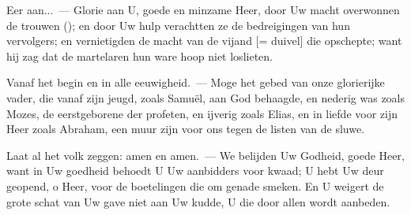 \documentclass[12pt,twoside,a5paper]{article}
\begin{document}
\begin{halfparskip}
  Eer aan...~--- Glorie aan U, goede en minzame Heer, door Uw macht overwonnen de trouwen (); en door Uw hulp verachtten ze de bedreigingen van hun vervolgers; en vernietigden de macht van de vijand [= duivel] die opschepte; want hij zag dat de martelaren hun ware hoop niet loslieten.

  Vanaf het begin en in alle eeuwigheid.~--- Moge het gebed van onze glorierijke vader, die vanaf zijn jeugd, zoals Samuël, aan God behaagde, en nederig was zoals Mozes, de eerstgeborene der profeten, en ijverig zoals Elias, en in liefde voor zijn Heer zoals Abraham, een muur zijn voor ons tegen de listen van de sluwe.

  Laat al het volk zeggen: amen en amen.~--- We belijden Uw Godheid, goede Heer, want in Uw goedheid behoedt U Uw aanbidders voor kwaad; U hebt Uw deur geopend, o Heer, voor de boetelingen die om genade smeken. En U weigert de grote schat van Uw gave niet aan Uw kudde, U die door allen wordt aanbeden.
\end{halfparskip}

\end{document}

